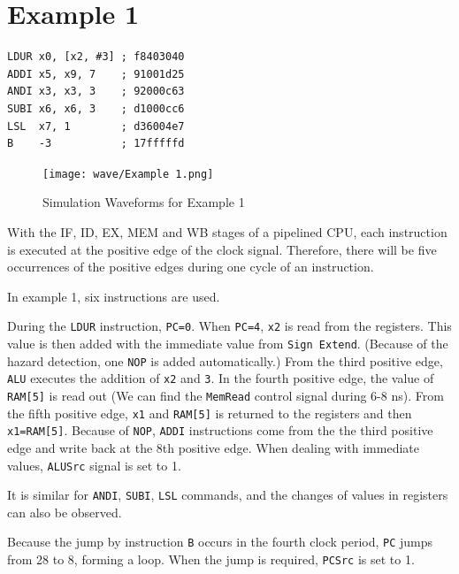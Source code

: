 \documentclass[11pt,fancy,bibstyle=ieee]{elegantbook}
\begin{document}
  \section{Example 1}

    \begin{lstlisting}[language={[x86masm]Assembler}, columns=fixed, morekeywords={LDUR,ADDI,ANDI,SUBI,B}]
LDUR x0, [x2, #3] ; f8403040
ADDI x5, x9, 7    ; 91001d25
ANDI x3, x3, 3    ; 92000c63
SUBI x6, x6, 3    ; d1000cc6
LSL  x7, 1        ; d36004e7
B    -3           ; 17fffffd
    \end{lstlisting}

    \begin{figure}[htbp]
      \centering
      \texttt{[image: wave/Example 1.png]}
      \caption{Simulation Waveforms for Example 1}
      \label{fig:sim_1}
    \end{figure}

    With the IF, ID, EX, MEM and WB stages of a pipelined CPU, each instruction is executed at the positive edge of the clock signal.
    Therefore, there will be five occurrences of the positive edges during one cycle of an instruction.
    
    In example 1, six instructions are used.

    During the \texttt{LDUR} instruction, \texttt{PC=0}.
    When \texttt{PC=4}, \texttt{x2} is read from the registers.
    This value is then added with the immediate value from \texttt{Sign Extend}.
    (Because of the hazard detection, one \texttt{NOP} is added automatically.)
    From the third positive edge, \texttt{ALU} executes the addition  of \texttt{x2} and \texttt{3}. In the fourth positive edge, the value of \texttt{RAM[5]} is read out (We can find the \texttt{MemRead} control signal during 6-8 ns).
    From the fifth positive edge, \texttt{x1} and \texttt{RAM[5]} is returned to the registers and then \texttt{x1=RAM[5]}.
    Because of \texttt{NOP}, \texttt{ADDI} instructions come from the the third positive edge and write back at the 8th positive edge.
    When dealing with immediate values, \texttt{ALUSrc} signal is set to 1.

    It is similar for \texttt{ANDI}, \texttt{SUBI}, \texttt{LSL} commands, and the changes of values in registers can also be observed.

    Because the jump by instruction \texttt{B} occurs in the fourth clock period, \texttt{PC} jumps from 28 to 8, forming a loop.
    When the jump is required, \texttt{PCSrc} is set to 1.
\end{document}
